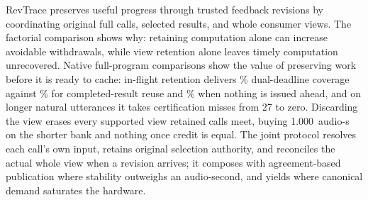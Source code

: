 RevTrace preserves useful progress through trusted feedback revisions by
coordinating original full calls, selected results, and whole consumer
views. The factorial comparison shows why: retaining computation alone
can increase avoidable withdrawals, while view retention alone leaves
timely computation unrecovered. Native full-program comparisons show the
value of preserving work before it is ready to cache: in-flight
retention delivers \NativeFullCreditPct\% dual-deadline coverage against
\NativeReadyCreditPct\% for completed-result reuse and
\NativeConsCreditPct\% when nothing is issued ahead, and on longer
natural utterances it takes certification misses from 27 to zero.
Discarding the view erases every supported view retained calls meet,
buying 1.000~audio-s on the shorter bank and nothing once credit is
equal. The joint protocol resolves each call's own input, retains
original selection authority, and reconciles the actual whole view when
a revision arrives; it composes with agreement-based publication where
stability outweighs an audio-second, and yields where canonical demand
saturates the hardware.
